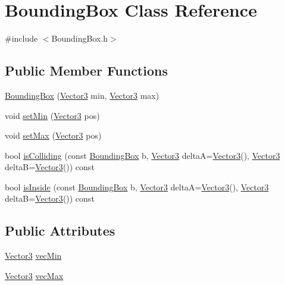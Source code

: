 \hypertarget{class_bounding_box}{}\section{Bounding\+Box Class Reference}
\label{class_bounding_box}


{\ttfamily \#include $<$Bounding\+Box.\+h$>$}

\subsection*{Public Member Functions}
\begin{DoxyCompactItemize}
\item 
\hyperlink{class_bounding_box_a06eeefc2e788138dc5e9f5da7a7c8a94}{Bounding\+Box} (\hyperlink{class_vector3}{Vector3} min, \hyperlink{class_vector3}{Vector3} max)
\item 
void \hyperlink{class_bounding_box_a49c72d3d0840294305fbf498050147db}{set\+Min} (\hyperlink{class_vector3}{Vector3} pos)
\item 
void \hyperlink{class_bounding_box_aa219028cad7432dcee337418bc4af118}{set\+Max} (\hyperlink{class_vector3}{Vector3} pos)
\item 
bool \hyperlink{class_bounding_box_ad8d240571651b64a2965f202d8ed99bd}{is\+Colliding} (const \hyperlink{class_bounding_box}{Bounding\+Box} b, \hyperlink{class_vector3}{Vector3} deltaA=\hyperlink{class_vector3}{Vector3}(), \hyperlink{class_vector3}{Vector3} deltaB=\hyperlink{class_vector3}{Vector3}()) const
\item 
bool \hyperlink{class_bounding_box_a7b9ce0524d009475a0616e96288b5f11}{is\+Inside} (const \hyperlink{class_bounding_box}{Bounding\+Box} b, \hyperlink{class_vector3}{Vector3} deltaA=\hyperlink{class_vector3}{Vector3}(), \hyperlink{class_vector3}{Vector3} deltaB=\hyperlink{class_vector3}{Vector3}()) const
\end{DoxyCompactItemize}
\subsection*{Public Attributes}
\begin{DoxyCompactItemize}
\item 
\hyperlink{class_vector3}{Vector3} \hyperlink{class_bounding_box_aa8c7acb6b1bd2ddb83473cf35e53156e}{vec\+Min}
\item 
\hyperlink{class_vector3}{Vector3} \hyperlink{class_bounding_box_a989d472955b679844ea9e48e888c5136}{vec\+Max}
\end{DoxyCompactItemize}


